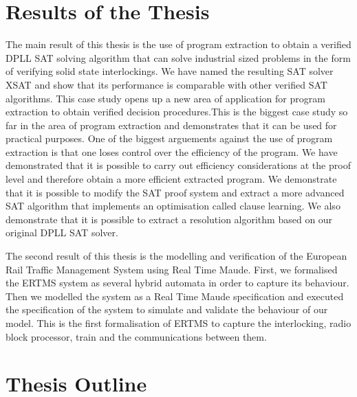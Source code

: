 \section{Results of the Thesis}


The main result of this thesis is the use of program extraction to obtain a verified DPLL SAT solving algorithm that can solve industrial sized problems in the form of verifying solid state interlockings. We have named the resulting SAT solver XSAT and show that its performance is comparable with other verified SAT algorithms. This case study opens up a new area of application for program extraction to obtain verified decision procedures.This is the biggest case study so far in the area of program extraction and demonstrates that it can be used for practical purposes.  One of the biggest arguements against the use of program extraction is that one loses control over the efficiency of the program. We have demonstrated that it is possible to carry out efficiency considerations at the proof level and therefore obtain a more efficient extracted program. We demonstrate that it is possible to modify the SAT proof system and extract a more advanced SAT algorithm that implements an optimisation called clause learning. We also demonstrate that it is possible to extract a resolution algorithm based on our original DPLL SAT solver.


The second result of this thesis is the modelling and verification of the European Rail Traffic Management System using Real Time Maude. First, we formalised the ERTMS system as several hybrid automata in order to capture its behaviour. Then we modelled the system as a Real Time Maude specification and executed the specification of the system to simulate and validate the behaviour of our model. This is the first formalisation of ERTMS to capture the interlocking, radio block processor, train and the communications between them.



\section{Thesis Outline}

